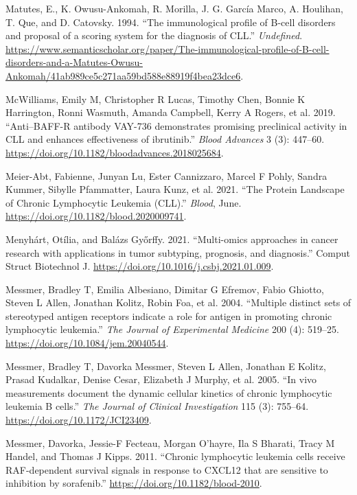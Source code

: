 \documentclass[11pt, a4paper, twosided]{book}
\newenvironment{CSLReferences}%
  {}%
  {\par}
\begin{document}
\begin{CSLReferences}{1}{0}
\leavevmode{}%
Matutes, E., K. Owusu-Ankomah, R. Morilla, J. G. García Marco, A. Houlihan, T. Que, and D. Catovsky. 1994. {``{The immunological profile of B-cell disorders and proposal of a scoring system for the diagnosis of CLL.}''} \emph{Undefined}. \url{https://www.semanticscholar.org/paper/The-immunological-profile-of-B-cell-disorders-and-a-Matutes-Owusu-Ankomah/41ab989ce5c271aa59bd588e88919f4bea23dce6}.

\leavevmode{}%
McWilliams, Emily M, Christopher R Lucas, Timothy Chen, Bonnie K Harrington, Ronni Wasmuth, Amanda Campbell, Kerry A Rogers, et al. 2019. {``{Anti--BAFF-R antibody VAY-736 demonstrates promising preclinical activity in CLL and enhances effectiveness of ibrutinib}.''} \emph{Blood Advances} 3 (3): 447--60. \url{https://doi.org/10.1182/bloodadvances.2018025684}.

\leavevmode{}%
Meier-Abt, Fabienne, Junyan Lu, Ester Cannizzaro, Marcel F Pohly, Sandra Kummer, Sibylle Pfammatter, Laura Kunz, et al. 2021. {``{The Protein Landscape of Chronic Lymphocytic Leukemia (CLL).}''} \emph{Blood}, June. \url{https://doi.org/10.1182/blood.2020009741}.

\leavevmode{}%
Menyhárt, Otília, and Balázs Győrffy. 2021. {``{Multi-omics approaches in cancer research with applications in tumor subtyping, prognosis, and diagnosis}.''} Comput Struct Biotechnol J. \url{https://doi.org/10.1016/j.csbj.2021.01.009}.

\leavevmode{}%
Messmer, Bradley T, Emilia Albesiano, Dimitar G Efremov, Fabio Ghiotto, Steven L Allen, Jonathan Kolitz, Robin Foa, et al. 2004. {``{Multiple distinct sets of stereotyped antigen receptors indicate a role for antigen in promoting chronic lymphocytic leukemia.}''} \emph{The Journal of Experimental Medicine} 200 (4): 519--25. \url{https://doi.org/10.1084/jem.20040544}.

\leavevmode{}%
Messmer, Bradley T, Davorka Messmer, Steven L Allen, Jonathan E Kolitz, Prasad Kudalkar, Denise Cesar, Elizabeth J Murphy, et al. 2005. {``{In vivo measurements document the dynamic cellular kinetics of chronic lymphocytic leukemia B cells.}''} \emph{The Journal of Clinical Investigation} 115 (3): 755--64. \url{https://doi.org/10.1172/JCI23409}.

\leavevmode{}%
Messmer, Davorka, Jessie-F Fecteau, Morgan O'hayre, Ila S Bharati, Tracy M Handel, and Thomas J Kipps. 2011. {``{Chronic lymphocytic leukemia cells receive RAF-dependent survival signals in response to CXCL12 that are sensitive to inhibition by sorafenib}.''} \url{https://doi.org/10.1182/blood-2010}.


\end{CSLReferences}
\end{document}
